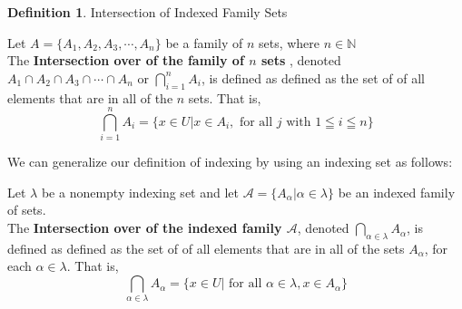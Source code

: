 \documentclass{book}
\theoremstyle{definition}
\newtheorem{definition}{Definition}[section]
\theoremstyle{remark}
\newcommand{\bb}[1]{\mathbb{#1}}
\begin{document}
\begin{definition}
Intersection of Indexed Family Sets \footnotemark \\
 
    \begin{tcolorbox}
    Let $A = \{A_1, A_2, A_3, \cdots, A_n  \}$ be a family of $n$ sets, where $n \in \bb{N}$ \\ 
    The \textbf{Intersection over of the family of $n$ sets} , denoted $A_1 \cap A_2 \cap A_3 \cap \cdots \cap A_n$ or $\bigcap_{i=1}^{n}{A_i}$, is defined as defined as the set of of all elements that are in all of the $n$ sets. That is,  
        \begin{equation*}
            \bigcap_{i=1}^{n}{A_i} = \{x \in U | x \in A_i, \text{ for all } j \text{ with } 1 \leqq i \leqq n \}
        \end{equation*}
    \end{tcolorbox}
    
We can generalize our definition of indexing by using an indexing set \footnotemark as follows:


    \begin{tcolorbox}
    Let $\lambda$ be a nonempty indexing set and let $\mathcal{A} = \{ A_{\alpha} | \alpha \in \lambda \}$ be an indexed family of sets. \\ 
    The \textbf{Intersection over of the indexed family $\mathcal{A}$}, denoted $\bigcap_{\alpha \in \lambda}{A_{\alpha}}$, is defined as defined as the set of of all elements that are in all of the sets $A_{\alpha}$, for each $\alpha \in \lambda$. That is,  
        \begin{equation*}
            \bigcap_{\alpha \in \lambda}{A_{\alpha}} = \{x \in U | \text{ for all } \alpha \in \lambda, x \in A_{\alpha} \}
        \end{equation*}
    \end{tcolorbox}
\end{definition}
\end{document}
